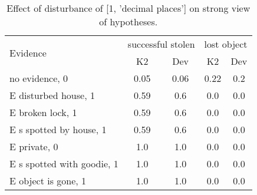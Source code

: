 \begin{table}\begin{tabular}{l|cc|cc}\toprule\multirow{2}{*}{Evidence} & \multicolumn{2}{c}{successful stolen}& \multicolumn{2}{c}{lost object}\\& {K2} & {Dev}& {K2} & {Dev}\\\midrule
no evidence, 0 & 0.05&0.06&0.22&0.2\\E disturbed house, 1 & 0.59&0.6&0.0&0.0\\E broken lock, 1 & 0.59&0.6&0.0&0.0\\E s spotted by house, 1 & 0.59&0.6&0.0&0.0\\E private, 0 & 1.0&1.0&0.0&0.0\\E s spotted with goodie, 1 & 1.0&1.0&0.0&0.0\\E object is gone, 1 & 1.0&1.0&0.0&0.0\\\bottomrule\end{tabular}\caption{Effect of disturbance of [1, 'decimal places'] on strong view of hypotheses.}\end{table}